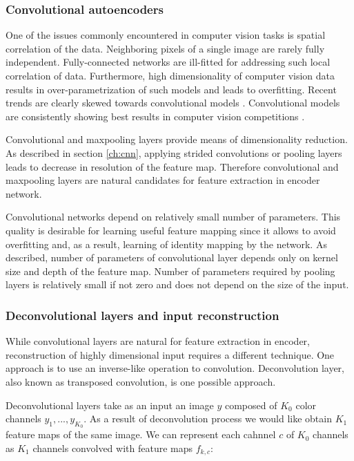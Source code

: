 \subsubsection{Convolutional autoencoders}

One of the issues commonly encountered in computer vision tasks is spatial correlation of the data.
Neighboring pixels of a single image are rarely fully independent.
Fully-connected networks are ill-fitted for addressing such local correlation of data.
Furthermore, high dimensionality of computer vision data results in over-parametrization of such models and leads to overfitting.
Recent trends are clearly skewed towards convolutional models \cite{He2015, Szegedy2016}.
Convolutional models are consistently showing best results in computer vision competitions \cite{ILSVRC15, Zhou2016}.

Convolutional and maxpooling layers provide means of dimensionality reduction.
As described in section \ref{ch:cnn}, applying strided convolutions or pooling layers leads to decrease in resolution of the feature map.
Therefore convolutional and maxpooling layers are natural candidates for feature extraction in encoder network.

Convolutional networks depend on relatively small number of parameters.
This quality is desirable for learning useful feature mapping since it allows to avoid overfitting and, as a result, learning of identity mapping by the network.
As described, number of parameters of convolutional layer depends only on kernel size and depth of the feature map.
Number of parameters required by pooling layers is relatively small if not zero and does not depend on the size of the input.

\subsubsection{Deconvolutional layers and input reconstruction}

While convolutional layers are natural for feature extraction in encoder, reconstruction of highly dimensional input requires a different technique.
One approach is to use an inverse-like operation to convolution.
Deconvolution layer, also known as transposed convolution, is one possible approach.

Deconvolutional layers \cite{Zeiler2010} take as an input an image $y$ composed of $K_0$ color channels $y_1, ... , y_{K_0}$.
As a result of deconvolution process we would like obtain $K_1$ feature maps of the same image.
We can represent each cahnnel $c$ of $K_0$ channels as $K_1$ channels convolved with feature maps $f_{k,c}$:

